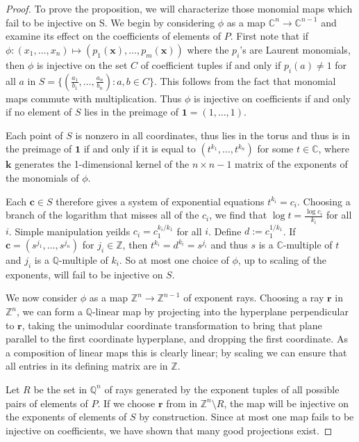 \documentclass[12pt]{amsart}
\begin{document}
\begin{proof}
To prove the proposition, we will characterize those monomial maps which fail to be injective on S. We begin by considering $\phi$ as a map $\mathbb{C}^n\rightarrow\mathbb{C}^{n-1}$ and examine its effect on the coefficients of elements of $P$. First note that if $\phi: (x_1,\ldots,x_n)\mapsto (p_1(\mathbf{x}),\ldots,p_m(\mathbf{x}))$ where the $p_i$'s are Laurent monomials, then $\phi$ is injective on the set $C$ of coefficient tuples if and only if $p_i(a)\neq1$ for all $a$ in $S=\{(\frac{a_1}{b_1},\ldots,\frac{a_n}{b_n}):a,b\in C\}$. This follows from the fact that monomial maps commute with multiplication. Thus $\phi$ is injective on coefficients if and only if no element of $S$ lies in the preimage of $\mathbf{1}=(1,\ldots,1)$.

Each point of $S$ is nonzero in all coordinates, thus lies in the torus and thus is in the preimage of $\mathbf{1}$ if and only if it is equal to $(t^{k_1},\ldots,t^{k_n})$ for some $t\in\mathbb{C}$, where $\mathbf{k}$ generates the 1-dimensional kernel of the $n\times n-1$ matrix of the exponents of the monomials of $\phi$.

Each $\mathbf{c}\in S$ therefore gives a system of exponential equations $t^{k_i}=c_i$. Choosing a branch of the logarithm that misses all of the $c_i$, we find that $\log t=\frac{\log c_i}{k_i}$ for all $i$. Simple manipulation yeilds $c_i=c_1^{k_i/k_1}$ for all $i$. Define $d:=c_1^{1/k_1}$. If $\mathbf{c}=(s^{j_1},\ldots,s^{j_n})$ for $j_i\in\mathbb{Z}$, then $t^{k_i}=d^{k_i}=s^{j_i}$ and thus $s$ is a $\mathbb{C}$-multiple of $t$ and $j_i$ is a $\mathbb{Q}$-multiple of $k_i$. So at most one choice of $\phi$, up to scaling of the exponents, will fail to be injective on $S$.

We now consider $\phi$ as a map $\mathbb{Z}^n\rightarrow\mathbb{Z}^{n-1}$ of exponent rays. Choosing a ray $\mathbf{r}$ in $\mathbb{Z}^n$, we can form a $\mathbb{Q}$-linear map by projecting into the hyperplane perpendicular to $\mathbf{r}$, taking the unimodular coordinate transformation to bring that plane parallel to the first coordinate hyperplane, and dropping the first coordinate. As a composition of linear maps this is clearly linear; by scaling we can ensure that all entries in its defining matrix are in $\mathbb{Z}$.

Let $R$ be the set in $\mathbb{Q}^n$ of rays generated by the exponent tuples of all possible pairs of elements of $P$. If we choose $\mathbf{r}$ from in $\mathbb{Z}^n\setminus R$, the map will be injective on the exponents of elements of $S$ by construction. Since at most one map fails to be injective on coefficients, we have shown that many good projections exist.
\end{proof}



\end{document}
